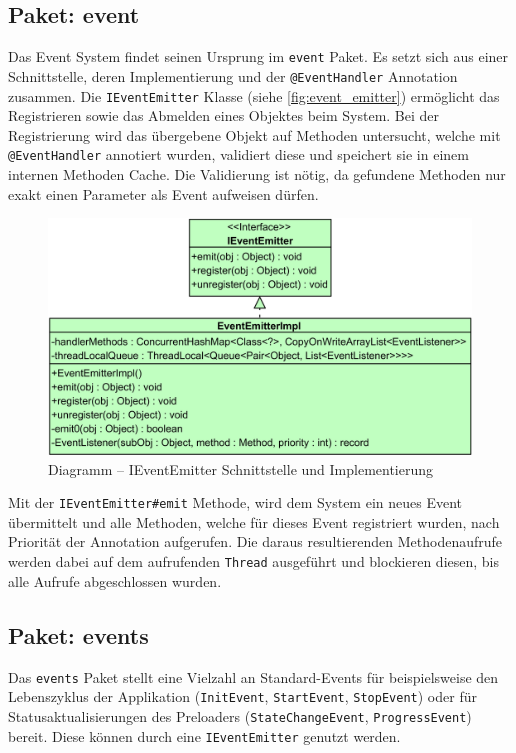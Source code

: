 \subsection{Paket: event}
Das Event System findet seinen Ursprung im \texttt{event} Paket. Es setzt sich aus einer Schnittstelle, deren Implementierung und der \texttt{@EventHandler} Annotation zusammen. Die \texttt{IEventEmitter} Klasse (siehe \autoref{fig:event_emitter}) ermöglicht das Registrieren sowie das Abmelden eines Objektes beim System. Bei der Registrierung wird das übergebene Objekt auf Methoden untersucht, welche mit \texttt{@EventHandler} annotiert wurden, validiert diese und speichert sie in einem internen Methoden Cache. Die Validierung ist nötig, da gefundene Methoden nur exakt einen Parameter als Event aufweisen dürfen. 
\begin{figure}[H]
	\centering
	\includegraphics[width=\textwidth-4cm]{Abbildungen/EventEmitter.png}
	\caption{Diagramm -- IEventEmitter Schnittstelle und Implementierung}
	\label{fig:event_emitter}
\end{figure}
\noindent Mit der \texttt{IEventEmitter\#emit} Methode, wird dem System ein neues Event übermittelt und alle Methoden, welche für dieses Event registriert wurden, nach Priorität der Annotation aufgerufen. Die daraus resultierenden Methodenaufrufe werden dabei auf dem aufrufenden \texttt{Thread} ausgeführt und blockieren diesen, bis alle Aufrufe abgeschlossen wurden.
\subsection{Paket: events}
Das \texttt{events} Paket stellt eine Vielzahl an Standard-Events für beispielsweise den Lebenszyklus der Applikation (\texttt{InitEvent}, \texttt{StartEvent}, \texttt{StopEvent}) oder für Statusaktualisierungen des Preloaders (\texttt{StateChangeEvent}, \texttt{ProgressEvent}) bereit. Diese können durch eine \texttt{IEventEmitter} genutzt werden.
